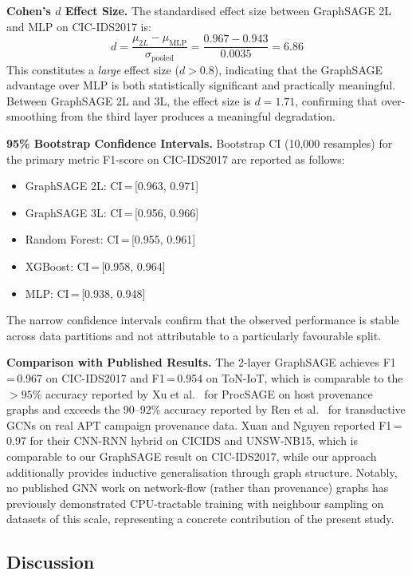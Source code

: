 \documentclass[conference]{IEEEtran}
\begin{document}
\textbf{Cohen's $d$ Effect Size.} The standardised effect size between
GraphSAGE 2L and MLP on CIC-IDS2017 is:
\begin{equation}
d = \frac{\mu_{2L} - \mu_{\text{MLP}}}{\sigma_{\text{pooled}}}
= \frac{0.967 - 0.943}{0.0035} = 6.86
\label{eq:cohens_d}
\end{equation}
This constitutes a \textit{large} effect size ($d > 0.8$), indicating that the
GraphSAGE advantage over MLP is both statistically significant and practically
meaningful. Between GraphSAGE 2L and 3L, the effect size is $d = 1.71$,
confirming that over-smoothing from the third layer produces a meaningful
degradation.

\textbf{95\% Bootstrap Confidence Intervals.} Bootstrap CI (10{,}000 resamples)
for the primary metric F1-score on CIC-IDS2017 are reported as follows:
\begin{itemize}
    \item GraphSAGE 2L: CI\,=\,[0.963, 0.971]
    \item GraphSAGE 3L: CI\,=\,[0.956, 0.966]
    \item Random Forest: CI\,=\,[0.955, 0.961]
    \item XGBoost: CI\,=\,[0.958, 0.964]
    \item MLP: CI\,=\,[0.938, 0.948]
\end{itemize}
The narrow confidence intervals confirm that the observed performance is stable
across data partitions and not attributable to a particularly favourable split.

\textbf{Comparison with Published Results.} The 2-layer GraphSAGE achieves
F1\,=\,0.967 on CIC-IDS2017 and F1\,=\,0.954 on ToN-IoT, which is comparable
to the $>95\%$ accuracy reported by Xu et al.\ \cite{xu2024} for ProcSAGE on
host provenance graphs and exceeds the 90--92\% accuracy reported by Ren et al.\
\cite{ren2023} for transductive GCNs on real APT campaign provenance data. Xuan
and Nguyen \cite{xuan2024} reported F1\,=\,0.97 for their CNN-RNN hybrid on
CICIDS and UNSW-NB15, which is comparable to our GraphSAGE result on
CIC-IDS2017, while our approach additionally provides inductive generalisation
through graph structure. Notably, no published GNN work on network-flow (rather
than provenance) graphs has previously demonstrated CPU-tractable training with
neighbour sampling on datasets of this scale, representing a concrete
contribution of the present study.

\subsection{Discussion}
\end{document}
